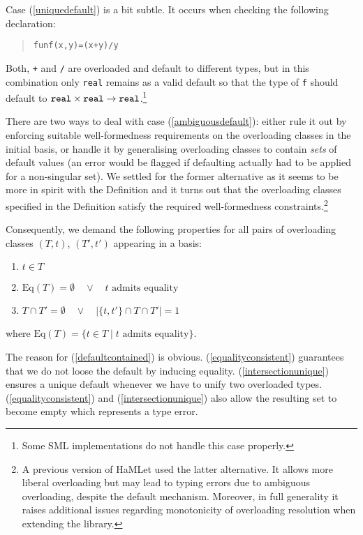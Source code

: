 \documentclass[twoside,titlepage]{article}
\begin{document}
Case (\ref{uniquedefault}) is a bit subtle. It occurs when checking the following declaration:

\begin{quote}
\begin{alltt}
fun f(x,y) = (x + y)/y
\end{alltt}
\end{quote}

Both, {\tt +} and {\tt /} are overloaded and default to different types, but in this combination only {\tt real} remains as a valid default so that the type of {\tt f} should default to ${\tt real}\times{\tt real}\to{\tt real}$.\footnote{Some SML implementations do not handle this case properly.}

There are two ways to deal with case (\ref{ambiguousdefault}): either rule it out by enforcing suitable well-formedness requirements on the overloading classes in the initial basis, or handle it by generalising overloading classes to contain {\em sets} of default values (an error would be flagged if defaulting actually had to be applied for a non-singular set). We settled for the former alternative as it seems to be more in spirit with the Definition and it turns out that the overloading classes specified in the Definition satisfy the required well-formedness constraints.\footnote{A previous version of HaMLet used the latter alternative. It allows more liberal overloading but may lead to typing errors due to ambiguous overloading, despite the default mechanism. Moreover, in full generality it raises additional issues regarding monotonicity of overloading resolution when extending the library.}

Consequently, we demand the following properties for all pairs of overloading classes $(T,t)$, $(T',t')$ appearing in a basis:

\begin{enumerate}
\item\label{defaultcontained} $t \in T$
\item\label{equalityconsistent} $\mbox{Eq}(T) = \emptyset \quad\vee\quad \mbox{$t$ admits equality}$
\item\label{intersectionunique} $T \cap T' = \emptyset \quad\vee\quad |\{t,t'\} \cap T \cap T'| = 1$
\end{enumerate}

where $\mbox{Eq}(T) = \{ t \in T \;|\; \mbox{$t$ admits equality} \}$.

The reason for (\ref{defaultcontained}) is obvious. (\ref{equalityconsistent}) guarantees that we do not loose the default by inducing equality. (\ref{intersectionunique}) ensures a unique default whenever we have to unify two overloaded types. (\ref{equalityconsistent}) and (\ref{intersectionunique}) also allow the resulting set to become empty which represents a type error.
\end{document}
